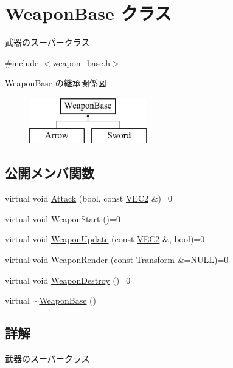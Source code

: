 \hypertarget{class_weapon_base}{}\section{Weapon\+Base クラス}
\label{class_weapon_base}


武器のスーパークラス  




{\ttfamily \#include $<$weapon\+\_\+base.\+h$>$}

Weapon\+Base の継承関係図\begin{figure}[H]
\begin{center}
\leavevmode
\includegraphics[height=2.000000cm]{class_weapon_base}
\end{center}
\end{figure}
\subsection*{公開メンバ関数}
\begin{DoxyCompactItemize}
\item 
virtual void \mbox{\hyperlink{class_weapon_base_a8663cb6d8510d5b3aff1129c575cbd9c}{Attack}} (bool, const \mbox{\hyperlink{common_8h_afb0c5e21d4133ff4f200992c0b534e1b}{V\+E\+C2}} \&)=0
\item 
virtual void \mbox{\hyperlink{class_weapon_base_a25cd4c351638b76377e93341a9545712}{Weapon\+Start}} ()=0
\item 
virtual void \mbox{\hyperlink{class_weapon_base_a389110ad7653d16eecfd9770a8b6b08e}{Weapon\+Update}} (const \mbox{\hyperlink{common_8h_afb0c5e21d4133ff4f200992c0b534e1b}{V\+E\+C2}} \&, bool)=0
\item 
virtual void \mbox{\hyperlink{class_weapon_base_a619809ea6c169446d9524f8089057436}{Weapon\+Render}} (const \mbox{\hyperlink{class_transform}{Transform}} \&=N\+U\+LL)=0
\item 
virtual void \mbox{\hyperlink{class_weapon_base_a417784a8c8bf73cd398a77b922fc110c}{Weapon\+Destroy}} ()=0
\item 
virtual \mbox{\hyperlink{class_weapon_base_a311bee6c8496581f21068867be48762f}{$\sim$\+Weapon\+Base}} ()
\end{DoxyCompactItemize}


\subsection{詳解}
武器のスーパークラス 


